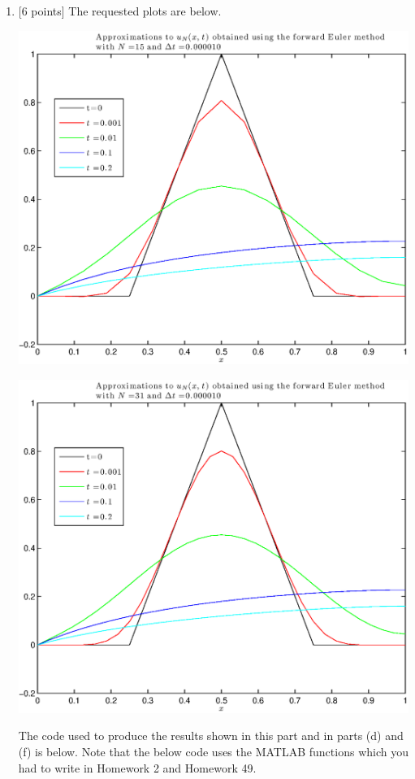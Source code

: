 \begin{solution}
\begin{enumerate}
\vspace*{1em}
\item {[6 points]} The requested plots are below.
\begin{center}
\includegraphics[scale=0.75]{hw50c15.eps}
\end{center}
\begin{center}
\includegraphics[scale=0.75]{hw50c31.eps}
\end{center}
The code used to produce the results shown in this part and in parts (d) and (f) is below.  Note that the below code uses the MATLAB functions which you had to write in Homework 2 and Homework 49.


\end{enumerate}
\end{solution}
